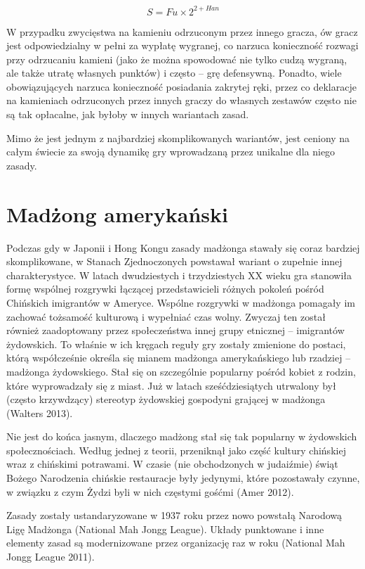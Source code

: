 	\begin{equation*}
		S = Fu \times 2^{2 + Han}
		\label{rīchi_scoring}
	\end{equation*}
	
W przypadku zwycięstwa na kamieniu odrzuconym przez innego gracza, ów gracz jest
odpowiedzialny w pełni za wypłatę wygranej, co narzuca konieczność rozwagi przy
odrzucaniu kamieni (jako że można spowodować nie tylko cudzą wygraną, ale także
utratę własnych punktów) i często -- grę defensywną. Ponadto, wiele
obowiązujących  narzuca konieczność posiadania zakrytej ręki, przez
co deklaracje na kamieniach odrzuconych przez innych graczy do własnych zestawów
często nie są tak opłacalne, jak byłoby w innych wariantach zasad.

Mimo że  jest jednym z najbardziej skomplikowanych wariantów, jest
ceniony na całym świecie za swoją dynamikę gry wprowadzaną przez unikalne dla
niego zasady. 

\section{Madżong amerykański}
\label{AMJ}
Podczas gdy w Japonii i Hong Kongu zasady madżonga stawały się coraz bardziej
skomplikowane, w Stanach Zjednoczonych powstawał wariant o zupełnie innej
charakterystyce. W latach dwudziestych i trzydziestych XX wieku gra stanowiła
formę wspólnej rozgrywki łączącej przedstawicieli różnych pokoleń pośród
Chińskich imigrantów w Ameryce. Wspólne rozgrywki w madżonga pomagały im
zachować tożsamość kulturową i wypełniać czas wolny. Zwyczaj ten został również
zaadoptowany przez społeczeństwa innej grupy etnicznej -- imigrantów żydowskich.
To właśnie w ich kręgach reguły gry zostały zmienione do postaci, którą
współcześnie określa się mianem madżonga amerykańskiego lub rzadziej --
madżonga żydowskiego. Stał się on szczególnie popularny pośród kobiet z rodzin,
które wyprowadzały się z miast. Już w latach sześćdziesiątych utrwalony był
(często krzywdzący) stereotyp żydowskiej gospodyni grającej w madżonga (Walters
2013).

Nie jest do końca jasnym, dlaczego madżong stał się tak popularny w żydowskich
społecznościach. Według jednej z teorii, przeniknął jako część kultury chińskiej
wraz z chińskimi potrawami.  W czasie (nie obchodzonych w judaiźmie)
świąt Bożego Narodzenia chińskie restauracje były jedynymi, które pozostawały
czynne, w związku z czym Żydzi byli w nich częstymi gośćmi (Amer 2012).

Zasady zostały ustandaryzowane w 1937 roku przez nowo powstałą Narodową Ligę
Madżonga (National Mah Jongg League). Układy punktowane i inne elementy zasad są
modernizowane przez organizację raz w roku (National Mah Jongg League 2011).


